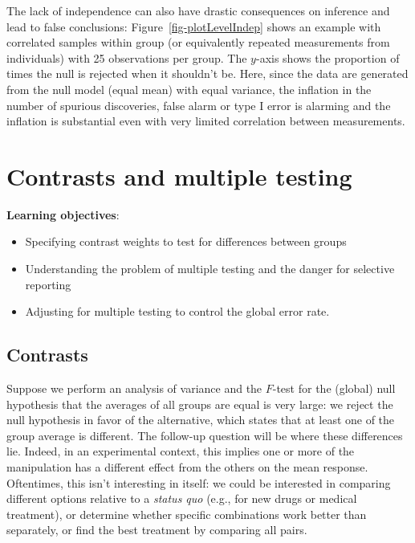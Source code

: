 \documentclass[
  11pt,
  letterpaper,
]{scrbook}
\providecommand{\tightlist}{%
  \setlength{\itemsep}{0pt}\setlength{\parskip}{0pt}}\usepackage{longtable,booktabs,array}
\theoremstyle{definition}
\theoremstyle{definition}
\theoremstyle{remark}
\begin{document}
The lack of independence can also have drastic consequences on inference
and lead to false conclusions: Figure~\ref{fig-plotLevelIndep} shows an
example with correlated samples within group (or equivalently repeated
measurements from individuals) with 25 observations per group. The
\(y\)-axis shows the proportion of times the null is rejected when it
shouldn't be. Here, since the data are generated from the null model
(equal mean) with equal variance, the inflation in the number of
spurious discoveries, false alarm or type I error is alarming and the
inflation is substantial even with very limited correlation between
measurements.


\chapter{Contrasts and multiple
testing}\label{contrasts-multiple-testing}

\begin{tcolorbox}[enhanced jigsaw, bottomrule=.15mm, coltitle=black, colframe=quarto-callout-important-color-frame, left=2mm, opacityback=0, breakable, opacitybacktitle=0.6, rightrule=.15mm, toprule=.15mm, title=\textcolor{quarto-callout-important-color}{\faExclamation}\hspace{0.5em}{Key concept}, toptitle=1mm, leftrule=.75mm, titlerule=0mm, colback=white, arc=.35mm, bottomtitle=1mm, colbacktitle=quarto-callout-important-color!10!white]

\textbf{Learning objectives}:

\begin{itemize}
\tightlist
\item
  Specifying contrast weights to test for differences between groups
\item
  Understanding the problem of multiple testing and the danger for
  selective reporting
\item
  Adjusting for multiple testing to control the global error rate.
\end{itemize}

\end{tcolorbox}

\section{Contrasts}\label{contrasts}

Suppose we perform an analysis of variance and the \(F\)-test for the
(global) null hypothesis that the averages of all groups are equal is
very large: we reject the null hypothesis in favor of the alternative,
which states that at least one of the group average is different. The
follow-up question will be where these differences lie. Indeed, in an
experimental context, this implies one or more of the manipulation has a
different effect from the others on the mean response. Oftentimes, this
isn't interesting in itself: we could be interested in comparing
different options relative to a \emph{status quo} (e.g., for new drugs
or medical treatment), or determine whether specific combinations work
better than separately, or find the best treatment by comparing all
pairs.
\end{document}
